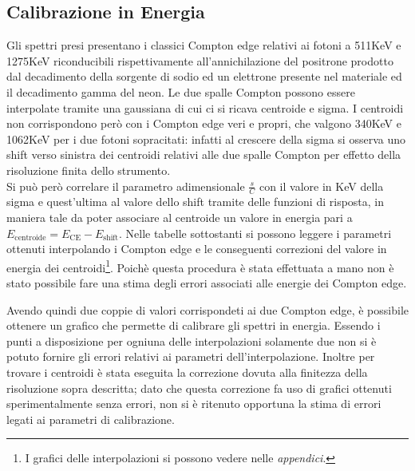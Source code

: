 \subsection{Calibrazione in Energia}
Gli spettri presi presentano i classici Compton edge relativi ai fotoni a 511KeV e 1275KeV riconducibili rispettivamente
all'annichilazione del positrone prodotto dal decadimento della sorgente di sodio ed un elettrone presente nel materiale ed il decadimento gamma del neon. Le due spalle Compton possono
essere interpolate tramite una gaussiana di cui ci si ricava centroide e sigma. I centroidi non corrispondono però con i Compton edge veri e propri, che valgono
340KeV e 1062KeV per i due fotoni sopracitati: infatti al crescere della sigma si osserva uno shift verso sinistra dei centroidi relativi alle due spalle Compton
per effetto della risoluzione finita dello strumento. \\
Si può però correlare il parametro adimensionale \(\frac{s}{C}\) con il valore in KeV della sigma e quest'ultima al valore dello shift tramite delle funzioni di 
risposta, in maniera tale da poter associare al centroide un valore in energia pari a \(E_{\text{centroide}} = E_{\text{CE}} - E_{\text{shift}}\).  Nelle tabelle
sottostanti si possono leggere i parametri ottenuti interpolando i Compton edge e le conseguenti correzioni del valore in energia dei centroidi\footnote{I grafici
delle interpolazioni si possono vedere nelle \textit{appendici}.}. Poichè questa procedura è stata effettuata a mano non è stato possibile fare una stima degli errori 
associati alle energie dei Compton edge.


%
\begin{table}[h]
	\centering
	
	\caption{Procedura calibrazione del rivelatore 1}
	\label{tab:calib_shift_1}
\end{table}
%
%
\begin{table}[h]
	\centering
	
	\caption{Procedura calibrazione del rivelatore 2}
	\label{tab:calib__shift_2}
\end{table}
%
Avendo quindi due coppie di valori corrispondeti ai due Compton edge, è possibile ottenere un grafico che permette di calibrare gli spettri in energia.
Essendo i punti a disposizione per ogniuna delle interpolazioni solamente due non si è potuto fornire gli errori relativi ai parametri dell'interpolazione. Inoltre per
trovare i centroidi è stata eseguita la correzione dovuta alla finitezza della risoluzione sopra descritta; dato che questa correzione fa uso di grafici ottenuti
sperimentalmente senza errori, non si è ritenuto opportuna la stima di errori legati ai parametri di calibrazione.


